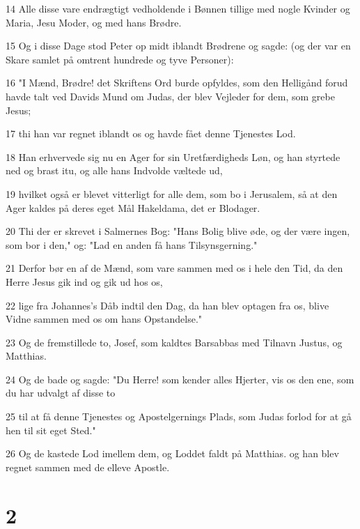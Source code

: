 \par 14 Alle disse vare endrægtigt vedholdende i Bønnen tillige med nogle Kvinder og Maria, Jesu Moder, og med hans Brødre.
\par 15 Og i disse Dage stod Peter op midt iblandt Brødrene og sagde: (og der var en Skare samlet på omtrent hundrede og tyve Personer):
\par 16 "I Mænd, Brødre! det Skriftens Ord burde opfyldes, som den Helligånd forud havde talt ved Davids Mund om Judas, der blev Vejleder for dem, som grebe Jesus;
\par 17 thi han var regnet iblandt os og havde fået denne Tjenestes Lod.
\par 18 Han erhvervede sig nu en Ager for sin Uretfærdigheds Løn, og han styrtede ned og brast itu, og alle hans Indvolde væltede ud,
\par 19 hvilket også er blevet vitterligt for alle dem, som bo i Jerusalem, så at den Ager kaldes på deres eget Mål Hakeldama, det er Blodager.
\par 20 Thi der er skrevet i Salmernes Bog: "Hans Bolig blive øde, og der være ingen, som bor i den," og: "Lad en anden få hans Tilsynsgerning."
\par 21 Derfor bør en af de Mænd, som vare sammen med os i hele den Tid, da den Herre Jesus gik ind og gik ud hos os,
\par 22 lige fra Johannes's Dåb indtil den Dag, da han blev optagen fra os, blive Vidne sammen med os om hans Opstandelse."
\par 23 Og de fremstillede to, Josef, som kaldtes Barsabbas med Tilnavn Justus, og Matthias.
\par 24 Og de bade og sagde: "Du Herre! som kender alles Hjerter, vis os den ene, som du har udvalgt af disse to
\par 25 til at få denne Tjenestes og Apostelgernings Plads, som Judas forlod for at gå hen til sit eget Sted."
\par 26 Og de kastede Lod imellem dem, og Loddet faldt på Matthias. og han blev regnet sammen med de elleve Apostle.

\chapter{2}

